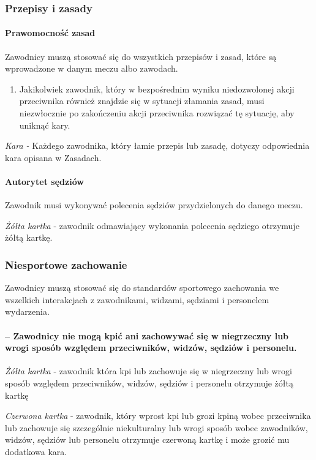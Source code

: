 \documentclass[12pt]{article}
\begin{document}
\subsubsection{Przepisy i zasady}

\paragraph{Prawomocność zasad}
Zawodnicy muszą stosować się do
wszystkich przepisów i zasad, które są wprowadzone w danym meczu albo
zawodach.
\begin{enumerate}
	\item Jakikolwiek zawodnik, który w bezpośrednim wyniku niedozwolonej akcji
	      przeciwnika również znajdzie się w sytuacji złamania zasad, musi
	      niezwłocznie po zakończeniu akcji przeciwnika rozwiązać tę sytuację, aby
	      uniknąć kary.
\end{enumerate}

\emph{Kara -} Każdego zawodnika, który łamie przepis lub zasadę, dotyczy
odpowiednia kara opisana w Zasadach.

\paragraph{Autorytet sędziów}
Zawodnik musi wykonywać polecenia
sędziów przydzielonych do danego meczu.

\emph{Żółta kartka} - zawodnik odmawiający wykonania polecenia sędziego
otrzymuje żółtą kartkę.

\subsubsection{Niesportowe zachowanie}

Zawodnicy muszą stosować się do standardów sportowego zachowania we
wszelkich interakcjach z zawodnikami, widzami, sędziami i personelem
wydarzenia.

\paragraph{-- Zawodnicy nie mogą kpić ani zachowywać się w
	niegrzeczny lub wrogi sposób względem przeciwników, widzów, sędziów i
	personelu.}

\emph{Żółta kartka} - zawodnik która kpi lub zachowuje się w niegrzeczny
lub wrogi sposób względem przeciwników, widzów, sędziów i personelu
otrzymuje żółtą kartkę

\emph{Czerwona kartka} - zawodnik, który wprost kpi lub grozi kpiną
wobec przeciwnika lub zachowuje się szczególnie niekulturalny lub wrogi
sposób wobec zawodników, widzów, sędziów lub personelu otrzymuje
czerwoną kartkę i może grozić mu dodatkowa kara.
\end{document}
